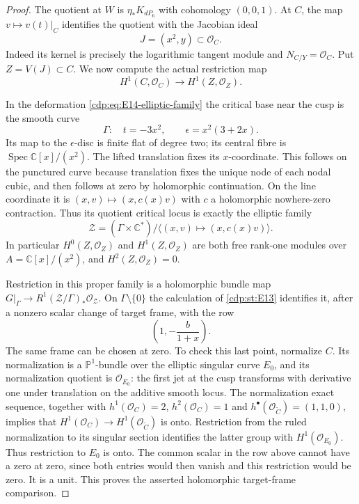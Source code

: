 \begin{proof}
The quotient at $W$ is $\eta_*K_{dP_6}$ with cohomology $(0,0,1)$.
At $C$, the map $v\mapsto v(t)|_C$ identifies the quotient with
the Jacobian ideal
\[
 J=(x^2,y)\subset\mathcal O_C.
\]
Indeed its kernel is precisely the logarithmic tangent module and
$N_{C/Y}=\mathcal O_C$. Put $Z=V(J)\subset C$. We now compute
the actual restriction map
\begin{equation}\label{cdp:eq:E14-jet-map}
 H^1(C,\mathcal O_C)\longrightarrow H^1(Z,\mathcal O_Z).
\end{equation}

In the deformation \eqref{cdp:eq:E14-elliptic-family} the critical
base near the cusp is the smooth curve
\[
 \Gamma:\quad t=-3x^2,\qquad
 \epsilon=x^2(3+2x).
\]
Its map to the $\epsilon$-disc is finite flat of degree two; its
central fibre is $\operatorname{Spec}\mathbb C[x]/(x^2)$.
The lifted translation fixes its $x$-coordinate. This follows on
the punctured curve because translation fixes the unique node of
each nodal cubic, and then follows at zero by holomorphic
continuation. On the line coordinate it is
$(x,v)\mapsto(x,c(x)v)$ with $c$ a holomorphic nowhere-zero
contraction. Thus its quotient critical locus is exactly the
elliptic family
\[
 \mathcal Z=(\Gamma\times\mathbb C^*)/
       \langle(x,v)\mapsto(x,c(x)v)\rangle.
\]
In particular $H^0(Z,\mathcal O_Z)$ and
$H^1(Z,\mathcal O_Z)$ are both free rank-one modules over
$A=\mathbb C[x]/(x^2)$, and $H^2(Z,\mathcal O_Z)=0$.

Restriction in this proper family is a holomorphic bundle map
$G|_\Gamma\to R^1(\mathcal Z/\Gamma)_*\mathcal O_{\mathcal Z}$.
On $\Gamma\setminus\{0\}$ the calculation of \ref{cdp:st:E13} identifies it,
after a nonzero scalar change of target frame, with the row
\[
 \left(1,-\frac{b}{1+x}\right).
\]
The same frame can be chosen at zero. To check this last point,
normalize $C$. Its normalization is a $\mathbb P^1$-bundle over
the elliptic singular curve $E_0$, and its normalization quotient
is $\mathcal O_{E_0}$: the first jet at the cusp transforms with
derivative one under translation on the additive smooth locus.
The normalization exact sequence, together with
$h^1(\mathcal O_C)=2$, $h^2(\mathcal O_C)=1$ and
$h^\bullet(\mathcal O_{\widetilde C})=(1,1,0)$, implies
that $H^1(\mathcal O_C)\to H^1(\mathcal O_{\widetilde C})$
is onto. Restriction from the ruled normalization to its singular
section identifies the latter group with $H^1(\mathcal O_{E_0})$.
Thus restriction to $E_0$ is onto. The common scalar in the row
above cannot have a zero at zero, since both entries would then
vanish and this restriction would be zero. It is a unit. This
proves the asserted holomorphic target-frame comparison.


\end{proof}
